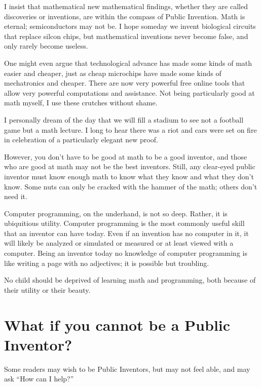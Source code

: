 \documentclass[
	fontsize=10pt, %
	twoside=false, %
	secnumdepth=1, %
]{kaobook}
\begin{document}
I insist that mathematical new mathematical findings, whether they are called
discoveries or inventions, are within the compass of Public Invention.
Math is eternal; semiconductors may not be. I hope someday we invent
biological circuits that replace silcon chips, but mathematical inventions
never become false, and only rarely become useless.

One might even argue that technological advance has made some kinds
of math easier and cheaper, just as cheap microchips have made some kinds of
mechatronics and cheaper. There are now very powerful free online tools
that allow very powerful computations and assistance.
Not being particularly good at math myself, I use these crutches without shame.

I personally dream of the day that we will fill a stadium to see not
a football game but a math lecture. I long to hear there was a riot and
cars were set on fire in celebration of a particularly elegant new proof.

However, you don't have to be good at math to be a good inventor, and
those who are good at math may not be the best inventors. Still,
any clear-eyed public inventor must know enough math to know what
they know and what they don't know. Some nuts can only be cracked
with the hammer of the math; others don't need it.

Computer programming, on the underhand, is not so deep.
Rather, it is ubiquitious utility. Computer programming
is the most commonly useful skill that an inventor can have today.
Even if an invention has no computer in it, it will likely be
analyzed or simulated or measured or at least viewed with a
computer. Being an inventor today no knowledge of computer
programming is like writing a page with no adjectives;
it is possible but troubling.

No child should be deprived of learning math and programming,
both because of their utility or their beauty.




\chapter{What if you cannot be a Public Inventor?}

Some readers may wish to be Public Inventors, but may not
feel able, and may ask ``How can I help?''
\end{document}
